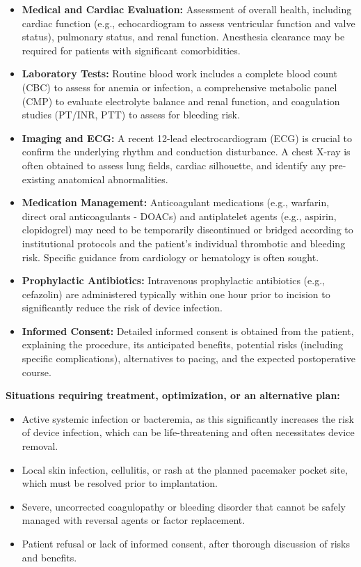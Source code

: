 \begin{itemize}
  \item \textbf{Medical and Cardiac Evaluation:} Assessment of overall health, including cardiac function (e.g., echocardiogram to assess ventricular function and valve status), pulmonary status, and renal function. Anesthesia clearance may be required for patients with significant comorbidities.
  \item \textbf{Laboratory Tests:} Routine blood work includes a complete blood count (CBC) to assess for anemia or infection, a comprehensive metabolic panel (CMP) to evaluate electrolyte balance and renal function, and coagulation studies (PT/INR, PTT) to assess for bleeding risk.
  \item \textbf{Imaging and ECG:} A recent 12-lead electrocardiogram (ECG) is crucial to confirm the underlying rhythm and conduction disturbance. A chest X-ray is often obtained to assess lung fields, cardiac silhouette, and identify any pre-existing anatomical abnormalities.
  \item \textbf{Medication Management:} Anticoagulant medications (e.g., warfarin, direct oral anticoagulants - DOACs) and antiplatelet agents (e.g., aspirin, clopidogrel) may need to be temporarily discontinued or bridged according to institutional protocols and the patient's individual thrombotic and bleeding risk. Specific guidance from cardiology or hematology is often sought.
  \item \textbf{Prophylactic Antibiotics:} Intravenous prophylactic antibiotics (e.g., cefazolin) are administered typically within one hour prior to incision to significantly reduce the risk of device infection.
  \item \textbf{Informed Consent:} Detailed informed consent is obtained from the patient, explaining the procedure, its anticipated benefits, potential risks (including specific complications), alternatives to pacing, and the expected postoperative course.
\end{itemize}

\textbf{Situations requiring treatment, optimization, or an alternative plan:}
\begin{itemize}
  \item Active systemic infection or bacteremia, as this significantly increases the risk of device infection, which can be life-threatening and often necessitates device removal.
  \item Local skin infection, cellulitis, or rash at the planned pacemaker pocket site, which must be resolved prior to implantation.
  \item Severe, uncorrected coagulopathy or bleeding disorder that cannot be safely managed with reversal agents or factor replacement.
  \item Patient refusal or lack of informed consent, after thorough discussion of risks and benefits.
\end{itemize}

